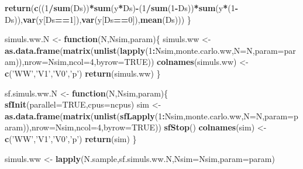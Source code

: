 \documentclass[]{book}
\newenvironment{Shaded}{\begin{snugshade}}{\end{snugshade}}
\newcommand{\ControlFlowTok}[1]{\textcolor[rgb]{0.13,0.29,0.53}{\textbf{#1}}}
\newcommand{\DataTypeTok}[1]{\textcolor[rgb]{0.13,0.29,0.53}{#1}}
\newcommand{\DecValTok}[1]{\textcolor[rgb]{0.00,0.00,0.81}{#1}}
\newcommand{\KeywordTok}[1]{\textcolor[rgb]{0.13,0.29,0.53}{\textbf{#1}}}
\newcommand{\NormalTok}[1]{#1}
\newcommand{\OperatorTok}[1]{\textcolor[rgb]{0.81,0.36,0.00}{\textbf{#1}}}
\newcommand{\OtherTok}[1]{\textcolor[rgb]{0.56,0.35,0.01}{#1}}
\newcommand{\StringTok}[1]{\textcolor[rgb]{0.31,0.60,0.02}{#1}}
\theoremstyle{definition}
\theoremstyle{definition}
\theoremstyle{definition}
\theoremstyle{remark}
\begin{document}
\begin{Shaded}
\begin{Highlighting}[]
  \KeywordTok{return}\NormalTok{(}\KeywordTok{c}\NormalTok{((}\DecValTok{1}\OperatorTok{/}\KeywordTok{sum}\NormalTok{(Ds))}\OperatorTok{*}\KeywordTok{sum}\NormalTok{(y}\OperatorTok{*}\NormalTok{Ds)}\OperatorTok{-}\NormalTok{(}\DecValTok{1}\OperatorTok{/}\KeywordTok{sum}\NormalTok{(}\DecValTok{1}\OperatorTok{-}\NormalTok{Ds))}\OperatorTok{*}\KeywordTok{sum}\NormalTok{(y}\OperatorTok{*}\NormalTok{(}\DecValTok{1}\OperatorTok{-}\NormalTok{Ds)),}\KeywordTok{var}\NormalTok{(y[Ds}\OperatorTok{==}\DecValTok{1}\NormalTok{]),}\KeywordTok{var}\NormalTok{(y[Ds}\OperatorTok{==}\DecValTok{0}\NormalTok{]),}\KeywordTok{mean}\NormalTok{(Ds)))}
\NormalTok{\}}

\NormalTok{simuls.ww.N <-}\StringTok{ }\ControlFlowTok{function}\NormalTok{(N,Nsim,param)\{}
\NormalTok{  simuls.ww <-}\StringTok{ }\KeywordTok{as.data.frame}\NormalTok{(}\KeywordTok{matrix}\NormalTok{(}\KeywordTok{unlist}\NormalTok{(}\KeywordTok{lapply}\NormalTok{(}\DecValTok{1}\OperatorTok{:}\NormalTok{Nsim,monte.carlo.ww,}\DataTypeTok{N=}\NormalTok{N,}\DataTypeTok{param=}\NormalTok{param)),}\DataTypeTok{nrow=}\NormalTok{Nsim,}\DataTypeTok{ncol=}\DecValTok{4}\NormalTok{,}\DataTypeTok{byrow=}\OtherTok{TRUE}\NormalTok{))}
  \KeywordTok{colnames}\NormalTok{(simuls.ww) <-}\StringTok{ }\KeywordTok{c}\NormalTok{(}\StringTok{'WW'}\NormalTok{,}\StringTok{'V1'}\NormalTok{,}\StringTok{'V0'}\NormalTok{,}\StringTok{'p'}\NormalTok{)}
  \KeywordTok{return}\NormalTok{(simuls.ww)}
\NormalTok{\}}

\NormalTok{sf.simuls.ww.N <-}\StringTok{ }\ControlFlowTok{function}\NormalTok{(N,Nsim,param)\{}
  \KeywordTok{sfInit}\NormalTok{(}\DataTypeTok{parallel=}\OtherTok{TRUE}\NormalTok{,}\DataTypeTok{cpus=}\NormalTok{ncpus)}
\NormalTok{  sim <-}\StringTok{ }\KeywordTok{as.data.frame}\NormalTok{(}\KeywordTok{matrix}\NormalTok{(}\KeywordTok{unlist}\NormalTok{(}\KeywordTok{sfLapply}\NormalTok{(}\DecValTok{1}\OperatorTok{:}\NormalTok{Nsim,monte.carlo.ww,}\DataTypeTok{N=}\NormalTok{N,}\DataTypeTok{param=}\NormalTok{param)),}\DataTypeTok{nrow=}\NormalTok{Nsim,}\DataTypeTok{ncol=}\DecValTok{4}\NormalTok{,}\DataTypeTok{byrow=}\OtherTok{TRUE}\NormalTok{))}
  \KeywordTok{sfStop}\NormalTok{()}
  \KeywordTok{colnames}\NormalTok{(sim) <-}\StringTok{ }\KeywordTok{c}\NormalTok{(}\StringTok{'WW'}\NormalTok{,}\StringTok{'V1'}\NormalTok{,}\StringTok{'V0'}\NormalTok{,}\StringTok{'p'}\NormalTok{)}
  \KeywordTok{return}\NormalTok{(sim)}
\NormalTok{\}}

\NormalTok{simuls.ww <-}\StringTok{ }\KeywordTok{lapply}\NormalTok{(N.sample,sf.simuls.ww.N,}\DataTypeTok{Nsim=}\NormalTok{Nsim,}\DataTypeTok{param=}\NormalTok{param)}


\end{Highlighting}
\end{Shaded}
\end{document}
